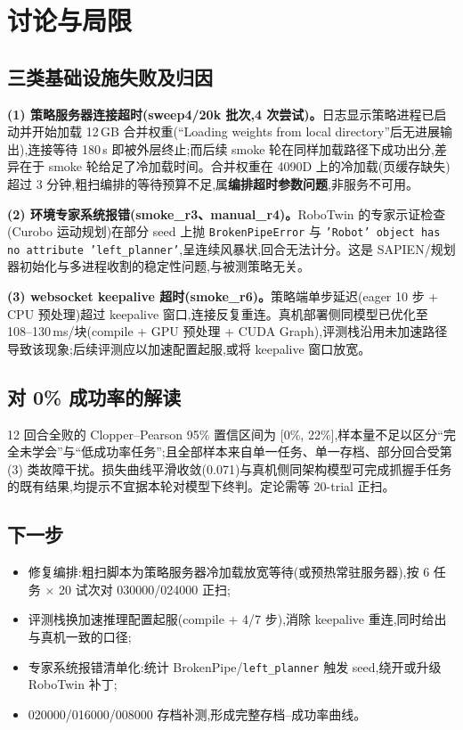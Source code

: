 \documentclass[11pt]{ctexart}
\begin{document}
\section{讨论与局限}\label{sec:fail}

\subsection{三类基础设施失败及归因}

\textbf{(1) 策略服务器连接超时(sweep4/20k 批次,4 次尝试)。}日志显示策略进程已启动并开始加载 12\,GB 合并权重(``Loading weights from local directory''后无进展输出),连接等待 180\,s 即被外层终止;而后续 smoke 轮在同样加载路径下成功出分,差异在于 smoke 轮给足了冷加载时间。合并权重在 4090D 上的冷加载(页缓存缺失)超过 3 分钟,粗扫编排的等待预算不足,属\textbf{编排超时参数问题},非服务不可用。

\textbf{(2) 环境专家系统报错(smoke\_r3、manual\_r4)。}RoboTwin 的专家示证检查(Curobo 运动规划)在部分 seed 上抛 \texttt{BrokenPipeError} 与 \texttt{'Robot' object has no attribute 'left\_planner'},呈连续风暴状,回合无法计分。这是 SAPIEN/规划器初始化与多进程收割的稳定性问题,与被测策略无关。

\textbf{(3) websocket keepalive 超时(smoke\_r6)。}策略端单步延迟(eager 10 步 + CPU 预处理)超过 keepalive 窗口,连接反复重连。真机部署侧同模型已优化至 108--130\,ms/块(compile + GPU 预处理 + CUDA Graph),评测栈沿用未加速路径导致该现象;后续评测应以加速配置起服,或将 keepalive 窗口放宽。

\subsection{对 0\% 成功率的解读}

12 回合全败的 Clopper--Pearson 95\% 置信区间为 [0\%, 22\%],样本量不足以区分``完全未学会''与``低成功率任务'';且全部样本来自单一任务、单一存档、部分回合受第 (3) 类故障干扰。损失曲线平滑收敛(0.071)与真机侧同架构模型可完成抓握手任务的既有结果,均提示不宜据本轮对模型下终判。定论需等 20-trial 正扫。

\subsection{下一步}

\begin{itemize}
\item 修复编排:粗扫脚本为策略服务器冷加载放宽等待(或预热常驻服务器),按 6 任务 $\times$ 20 试次对 030000/024000 正扫;
\item 评测栈换加速推理配置起服(compile + 4/7 步),消除 keepalive 重连,同时给出与真机一致的口径;
\item 专家系统报错清单化:统计 BrokenPipe/\texttt{left\_planner} 触发 seed,绕开或升级 RoboTwin 补丁;
\item 020000/016000/008000 存档补测,形成完整存档--成功率曲线。
\end{itemize}
\end{document}
